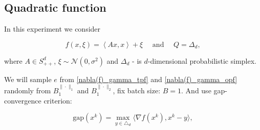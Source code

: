 \documentclass{article}
\begin{document}

    

    \subsection{Quadratic function}
        In this experiment we consider

        \begin{equation}
            \label{f Q ex1}
            f(x, \xi) = \left<Ax, x\right> + \xi \quad \text{ and } \quad Q = \Delta_d,
        \end{equation}

        where $A \in S^d_{++}$, $\xi \sim \mathcal{N}(0, \sigma^2)$ and $\Delta_d$ - is $d$-dimensional probabilistic simplex.

        We will sample $e$ from \eqref{nabla(f)_gamma_tpf} and \eqref{nabla(f)_gamma_opf} randomly from $B_1^{\|\cdot\|_1}$ and $B_1^{\|\cdot\|_2}$, fix batch size: $B = 1$. And use gap-convergence criterion:

        \begin{equation}
            \label{gap}
            \text{gap}(x^k) = \max_{y \in \triangle_d} \langle \nabla f(x^k), x^k - y \rangle,
        \end{equation}

        

  
\end{document}
